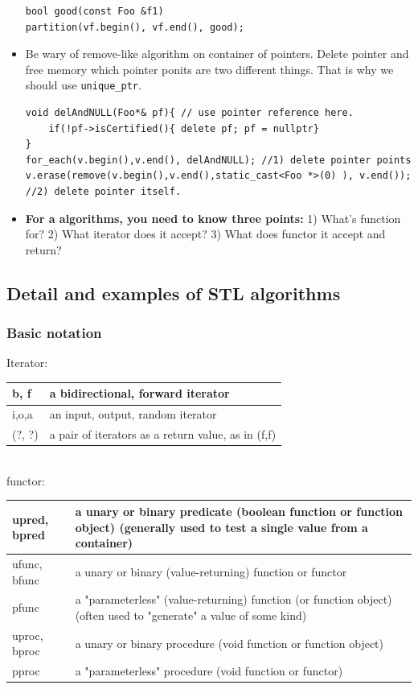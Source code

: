 \documentclass[a4paper,11pt,twoside]{book}
\newcommand{\tophline}{\hline }
\newcommand{\bottomhline}{\\ \hline }
\newcommand{\tophline}{ }
\newcommand{\bottomhline}{ }
\begin{document}
\begin{itemize}
\begin{lstlisting}[numbers=none]
bool good(const Foo &f1)
partition(vf.begin(), vf.end(), good);
\end{lstlisting}

	\item Be wary of remove-like algorithm on container of pointers. Delete pointer and free memory which pointer ponits are two different things. That is why we should use \texttt{unique\_ptr}.
\begin{lstlisting}[numbers=none]
void delAndNULL(Foo*& pf){ // use pointer reference here.
	if(!pf->isCertified(){ delete pf; pf = nullptr}
}
for_each(v.begin(),v.end(), delAndNULL); //1) delete pointer points
v.erase(remove(v.begin(),v.end(),static_cast<Foo *>(0) ), v.end()); 
//2) delete pointer itself. 
\end{lstlisting}

\item \textbf{For a algorithms, you need to know three points:}
	1) What's function  for?
	2) What iterator does it accept? 
	3) What does functor it accept and return?
	
\end{itemize}

\subsection{Detail and examples of STL algorithms}
\subsubsection{Basic notation}

Iterator:  \\
\begin{tabular}{| p{} |p{}|}
\tophline b, f &	a bidirectional, forward iterator \\
\tophline i,o,a 	&an input, output, random iterator  \\
\tophline(?, ?)	&a pair of iterators as a return value, as in (f,f) \bottomhline
\end{tabular} \\

functor:  \\
\begin{tabular}{| p{} |p{}|}
\tophline upred, bpred	& a unary or binary predicate (boolean function or function object)
(generally used to test a single value from a container) \\
\tophline ufunc, bfunc	&  a unary or binary  (value-returning) function or functor \\
\tophline pfunc	& a "parameterless" (value-returning) function (or function object)
(often used to "generate" a value of some kind) \\
\tophline uproc, bproc	& a unary or binary  procedure (void function or function object) \\
\tophline pproc	&  a "parameterless" procedure (void function or functor) \bottomhline
\end{tabular}
\end{document}
